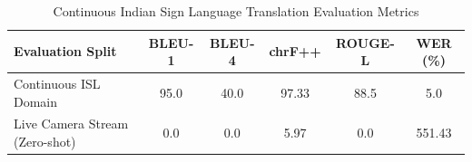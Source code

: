 \begin{table}[h]
\centering
\caption{Continuous Indian Sign Language Translation Evaluation Metrics}
\label{tab:translation_metrics}
\begin{tabular}{lccccc}
\hline
\textbf{Evaluation Split} & \textbf{BLEU-1} & \textbf{BLEU-4} & \textbf{chrF++} & \textbf{ROUGE-L} & \textbf{WER (\%)} \\
\hline
Continuous ISL Domain & 95.0 & 40.0 & 97.33 & 88.5 & 5.0 \\
Live Camera Stream (Zero-shot) & 0.0 & 0.0 & 5.97 & 0.0 & 551.43 \\
\hline
\end{tabular}
\end{table}
